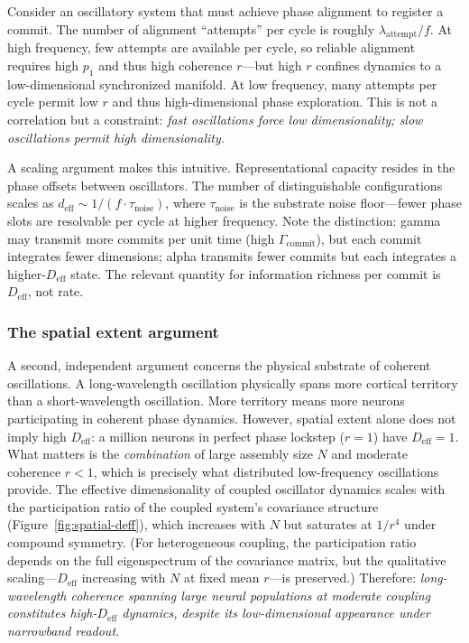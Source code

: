 \documentclass[12pt]{article}
\newcommand{\Deff}{D_{\mathrm{eff}}}
\begin{document}
Consider an oscillatory system that must achieve phase alignment to register a commit.
The number of alignment ``attempts'' per cycle is roughly $\lambda_{\mathrm{attempt}} / f$.
At high frequency, few attempts are available per cycle, so reliable alignment requires
high $p_1$ and thus high coherence $r$---but high $r$ confines dynamics to a
low-dimensional synchronized manifold. At low frequency, many attempts per cycle permit
low $r$ and thus high-dimensional phase exploration. This is not a correlation but a
constraint: \emph{fast oscillations force low dimensionality; slow oscillations permit
high dimensionality.}

A scaling argument makes this intuitive. Representational capacity resides in the phase
offsets between oscillators. The number of distinguishable configurations scales as
$d_{\mathrm{eff}} \sim 1/(f \cdot \tau_{\mathrm{noise}})$, where $\tau_{\mathrm{noise}}$
is the substrate noise floor---fewer phase slots are resolvable per cycle at higher
frequency. Note the distinction: gamma may transmit more commits per unit time (high $\Gamma_{\mathrm{commit}}$), but each commit integrates fewer dimensions; alpha transmits fewer commits but each integrates a higher-$\Deff$ state. The relevant quantity for information richness per commit is $\Deff$, not rate.

\subsubsection{The spatial extent argument}

A second, independent argument concerns the physical substrate of coherent oscillations.
A long-wavelength oscillation physically spans more cortical territory than a
short-wavelength oscillation. More territory means more neurons participating in
coherent phase dynamics. However, spatial extent alone does not imply high $\Deff$:
a million neurons in perfect phase lockstep ($r = 1$) have $\Deff = 1$. What matters
is the \emph{combination} of large assembly size $N$ and moderate coherence $r < 1$,
which is precisely what distributed low-frequency oscillations provide. The effective
dimensionality of coupled oscillator dynamics scales with the participation ratio of
the coupled system's covariance structure (Figure~\ref{fig:spatial-deff}), which
increases with $N$ but saturates at $1/r^4$ under compound symmetry. (For heterogeneous coupling, the participation ratio depends on the full eigenspectrum of the covariance matrix, but the qualitative scaling---$\Deff$ increasing with $N$ at fixed mean $r$---is preserved.) Therefore:
\emph{long-wavelength coherence spanning large neural populations at moderate coupling
constitutes high-$\Deff$ dynamics, despite its low-dimensional appearance under
narrowband readout.}
\end{document}
